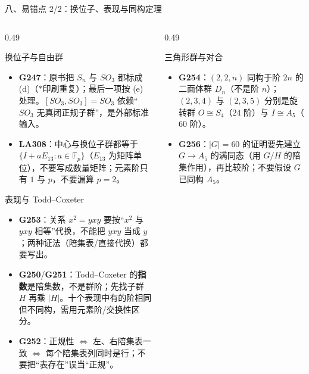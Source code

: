 \documentclass[aspectratio=169,10pt,fontset=none]{ctexbeamer}
\newcommand{\ex}[1]{\textcolor{accent}{\footnotesize\bfseries #1}}
\newcommand{\starpt}{\textcolor{accent}{\bfseries$\ast$}}
\begin{document}
\begin{frame}[t]{八、易错点 2/2：换位子、表现与同构定理}
  \label{sec:pitfalls2}
  \begin{columns}[T,onlytextwidth]
    \begin{column}{0.49\textwidth}
      \begin{alertblock}{\footnotesize 换位子与自由群}
        \scriptsize
        \begin{itemize}\setlength{\itemsep}{1pt}
          \item \ex{G247}：原书把 $S_n$ 与 $SO_3$ 都标成 (d)（\starpt 印刷重复）；最后一项按 (e) 处理。$[SO_3,SO_3]=SO_3$ 依赖“$SO_3$ 无真闭正规子群”，是外部标准输入。
          \item \ex{LA308}：中心与换位子群都等于 $\{I+aE_{13}:a\in\mathbb F_p\}$（$E_{13}$ 为矩阵单位），不要写成数量矩阵；元素阶只有 $1$ 与 $p$，不要漏算 $p=2$。
        \end{itemize}
      \end{alertblock}
      \begin{alertblock}{\footnotesize 表现与 Todd--Coxeter}
        \scriptsize
        \begin{itemize}\setlength{\itemsep}{1pt}
          \item \ex{G253}：关系 $x^2=yxy$ 要按“$x^2$ 与 $yxy$ 相等”代换，不能把 $yxy$ 当成 $y$；两种证法（陪集表/直接代换）都要写出。
          \item \ex{G250}/\ex{G251}：Todd--Coxeter 的\textbf{指数}是陪集数，不是群阶；先找子群 $H$ 再乘 $|H|$。十个表现中有的阶相同但不同构，需用元素阶/交换性区分。
          \item \ex{G252}：正规性 $\iff$ 左、右陪集表一致 $\iff$ 每个陪集表列同时是行；不要把“表存在”误当“正规”。
        \end{itemize}
      \end{alertblock}
    \end{column}
    \begin{column}{0.49\textwidth}
      \begin{alertblock}{\footnotesize 三角形群与对合}
        \scriptsize
        \begin{itemize}\setlength{\itemsep}{1pt}
          \item \ex{G254}：$(2,2,n)$ 同构于阶 $2n$ 的二面体群 $D_n$（不是阶 $n$）；$(2,3,4)$ 与 $(2,3,5)$ 分别是旋转群 $O\cong S_4$（$24$ 阶）与 $I\cong A_5$（$60$ 阶）。
          \item \ex{G256}：$|G|=60$ 的证明要先建立 $G\to A_5$ 的满同态（用 $G/H$ 的陪集作用），再比较阶；不要假设 $G$ 已同构 $A_5$。

\end{itemize}
\end{alertblock}
\end{column}
\end{columns}
\end{frame}
\end{document}
